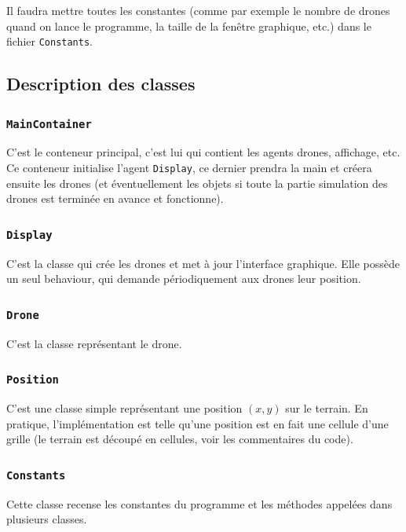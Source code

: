 \documentclass[11pt]{report}
\begin{document}
Il faudra mettre toutes les constantes (comme par exemple le nombre de drones quand on lance le programme,  la taille de la fenêtre graphique, etc.) dans le fichier \verb|Constants|.

\newpage
\subsection{Description des classes}
\subsubsection{\protect\Verb+MainContainer+}

C'est le conteneur principal, c'est lui qui contient les agents drones, affichage, etc. Ce conteneur initialise l'agent \verb|Display|, ce dernier prendra la main et créera ensuite les drones (et éventuellement les objets si toute la partie simulation des drones est terminée en avance et fonctionne).

\subsubsection{\protect\Verb+Display+}

C'est la classe qui crée les drones et met à jour l'interface graphique. Elle possède un seul behaviour, qui demande périodiquement aux drones leur position.

\subsubsection{\protect\Verb+Drone+}

C'est la classe représentant le drone.

\subsubsection{\protect\Verb+Position+}

C'est une classe simple représentant une position $(x, y)$ sur le terrain. En pratique, l'implémentation est telle qu'une position est en fait une cellule d'une grille (le terrain est découpé en cellules, voir les commentaires du code).

\subsubsection{\protect\Verb+Constants+}

Cette classe recense les constantes du programme et les méthodes appelées dans plusieurs classes.
\end{document}

